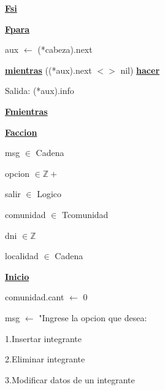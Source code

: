 \documentclass{article}
\begin{document}
            \hspace{16mm}\underline{\textbf{Fsi}}

        \hspace{12mm}\underline{\textbf{Fpara}}

        \hspace{12mm}aux $\leftarrow$ (*cabeza).next

        \hspace{12mm}\underline{\textbf{mientras}} ((*aux).next $<>$ nil) \underline{\textbf{hacer}}

            \hspace{16mm}Salida: (*aux).info

        \hspace{12mm}\underline{\textbf{Fmientras}}

    \hspace{4mm}\underline{\textbf{Faccion}}

    \vspace{4mm}

    \hspace{4mm}msg $\in$ Cadena

    \hspace{4mm}opcion $\in \mathbb{Z+}$

    \hspace{4mm}salir $\in$ Logico

    \hspace{4mm}comunidad $\in$ Tcomunidad

    \hspace{4mm}dni $\in \mathbb{Z}$

    \hspace{4mm}localidad $\in$ Cadena

    \vspace{4mm}

    \underline{\textbf{Inicio}}

    \hspace{4mm}comunidad.cant $\leftarrow$ 0

    \hspace{4mm}msg $\leftarrow$ "Ingrese la opcion que desea: 

        \hspace{17mm}1.Insertar integrante

        \hspace{17mm}2.Eliminar integrante

        \hspace{17mm}3.Modificar datos de un integrante
\end{document}
